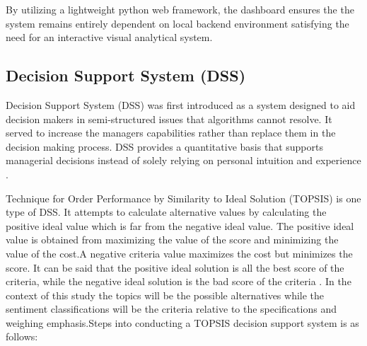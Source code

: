 By utilizing a lightweight python web framework, the dashboard ensures the the system remains entirely dependent on local backend environment satisfying the need for
an interactive visual analytical system.

\subsection*{Decision Support System (DSS)}

Decision Support System (DSS) was first introduced as a system designed to aid decision makers in semi-structured issues that algorithms cannot resolve. It served to increase the managers capabilities rather than replace them in the decision making process. DSS provides a quantitative basis that supports managerial decisions instead of solely relying on personal intuition and experience \parencite{Rashidi2018}.

Technique for Order Performance by Similarity to Ideal
Solution (TOPSIS) is one type of DSS. It attempts to calculate alternative values by calculating the positive ideal value which is far from the negative ideal value. The positive ideal value is obtained from
maximizing the value of the score and minimizing the value of the cost.A negative criteria value maximizes the cost but minimizes the score. It can be said that the positive ideal solution is all the best score of the criteria, while the negative ideal solution is the bad score of the criteria \parencite{daniati2021topsis}. In the context of this study the topics will be the possible alternatives while the sentiment classifications will be the criteria relative to the specifications and weighing emphasis.Steps into conducting a TOPSIS decision support system is as follows:

